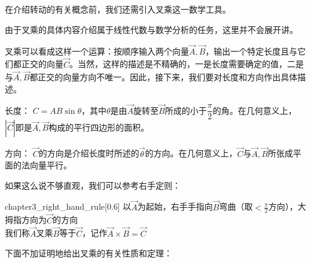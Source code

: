 	
\subsection[叉乘]{}
在介绍转动的有关概念前，我们还需引入叉乘这一数学工具。

由于叉乘的具体内容介绍属于线性代数与数学分析的任务，这里并不会展开讲。

叉乘可以看成这样一个运算：按顺序输入两个向量$\vec{A},\vec{B}$，输出一个特定长度且与它们都正交的向量$\vec{C}$。当然，这样的描述是不精确的，一是长度需要确定的值，二是与$\vec{A},\vec{B}$都正交的向量方向不唯一。因此，接下来，我们要对长度和方向作出具体描述。

\begin{Itemize}
	\item 长度： $C=AB\sin\theta$，其中$\theta$是由$\vec{A}$旋转至$\vec{B}$所成的小于$\dfrac{\pi}{2}$的角\footnotemark 。在几何意义上，$|\vec{C}|$即是$\vec{A},\vec{B}$构成的平行四边形的面积。
	\item 方向： $\vec{C}$的方向是介绍长度时所述的$\vec{\theta}$的方向。在几何意义上，$\vec{C}$与$\vec{A},\vec{B}$所张成平面的法向量平行。
\end{Itemize}

如果这么说不够直观，我们可以参考右手定则：

\begin{singlefigure}{chapter3_right_hand_rule}[0.6]
	以$\vec{A}$为起始，右手手指向$\vec{B}$弯曲（取$<\frac{\pi}{2}$方向），大拇指方向为$\vec{C}$的方向\\
	我们称$\vec{A}$叉乘$\vec{B}$等于$\vec{C}$，记作$\vec{A}\times\vec{B}=\vec{C}$
\end{singlefigure}

下面不加证明地给出叉乘的有关性质和定理：


